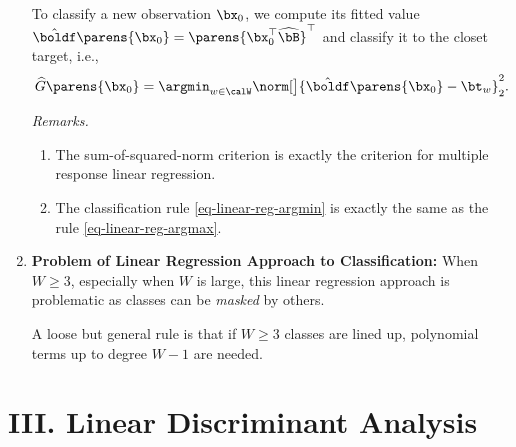 \documentclass[12pt]{article}
\begin{document}
\begin{enumerate}[label=\textbf{\arabic*.}]
	To classify a new observation $\bx_0$, we compute its fitted value $\hat{\boldf} \parens{\bx_0} = \parens{\bx_0^\top \widehat{\bB}}^\top$ and classify it to the closet target, i.e., 
	\begin{align}\label{eq-linear-reg-argmin}
		\widehat{G} \parens{\bx_0} = \argmin_{w \in \calW} \norm[\big]{\hat{\boldf} \parens{\bx_0} - \bt_w}_2^2. 
	\end{align}
	
	\textit{Remarks.} 
	\begin{enumerate}
		\item The sum-of-squared-norm criterion is exactly the criterion for multiple response linear regression. 
		
		\item The classification rule \eqref{eq-linear-reg-argmin} is exactly the same as the rule \eqref{eq-linear-reg-argmax}. 
	\end{enumerate}
	
	\item \textbf{Problem of Linear Regression Approach to Classification:} When $W \ge 3$, especially when $W$ is large, this linear regression approach is problematic as classes can be \textit{masked} by others. 
	
	A loose but general rule is that if $W \ge 3$ classes are lined up, polynomial terms up to degree $W - 1$ are needed. 
	
\end{enumerate}

\section*{III. Linear Discriminant Analysis}
\end{document}
